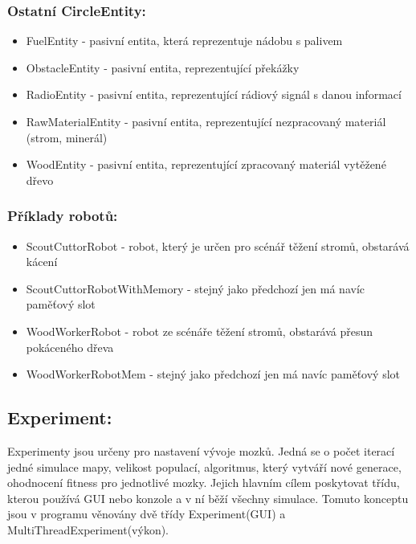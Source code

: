 \documentclass[12pt, oneside]{article}
\begin{document}
\subsubsection{Ostatní CircleEntity: }
\begin{itemize}
\item FuelEntity - pasivní entita, která reprezentuje nádobu s palivem
\item ObstacleEntity - pasivní entita, reprezentující překážky
\item  RadioEntity  - pasivní entita, reprezentující rádiový signál s danou informací 
\item  RawMaterialEntity - pasivní entita, reprezentující nezpracovaný materiál (strom, minerál) 
\item  WoodEntity - pasivní entita, reprezentující zpracovaný materiál vytěžené dřevo
\end{itemize}
\subsubsection{Příklady robotů:}
\begin{itemize}
\item ScoutCuttorRobot - robot, který je určen pro scénář těžení stromů, obstarává kácení
\item ScoutCuttorRobotWithMemory -  stejný jako předchozí jen má navíc paměťový slot
\item WoodWorkerRobot - robot ze scénáře těžení stromů, obstarává přesun pokáceného dřeva 
\item WoodWorkerRobotMem - stejný jako předchozí jen má navíc paměťový slot
\end{itemize}
\newpage 
\subsection{Experiment:}
Experimenty jsou určeny pro nastavení vývoje mozků. Jedná se o počet iterací jedné simulace mapy, velikost populací, algoritmus, který vytváří nové generace, ohodnocení fitness pro jednotlivé mozky. Jejich hlavním cílem poskytovat třídu, kterou používá GUI nebo konzole a v ní běží všechny simulace. Tomuto konceptu jsou v programu věnovány dvě třídy Experiment(GUI) a MultiThreadExperiment(výkon). \par
\end{document}
